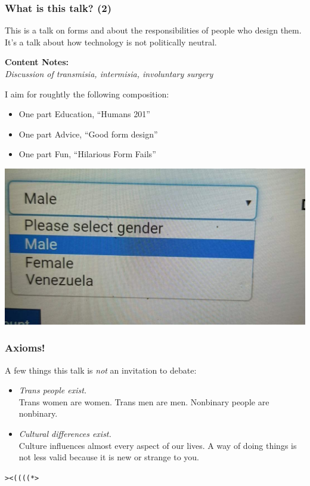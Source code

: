 \documentclass[aspectratio=169,x11names]{beamer}
\begin{document}
\begin{frame}
\frametitle{What is this talk? (2)}
\large

This is a talk on forms and about the responsibilities of people who design them. It's a talk about how technology is not politically neutral.

\pause\bigskip

\begin{center}
\textbf{Content Notes:}\\
\emph{Discussion of transmisia, intermisia, involuntary surgery}
\end{center}

\pause\bigskip

I aim for roughtly the following composition:
\medskip

\begin{itemize}
\item One part Education, ``Humans 201''
\item One part Advice, ``Good form design''
\item One part Fun, ``Hilarious Form Fails''
\end{itemize}
\end{frame}

\begin{frame}
\begin{center}
\includegraphics[scale=0.3]{images/ineffyble_01} 
\end{center}
\end{frame}


\begin{frame}
\frametitle{Axioms!}
A few things this talk is \emph{not} an invitation to debate:
\bigskip

\begin{itemize}
\item\emph{Trans people exist.}\\
Trans women are women. Trans men are men. Nonbinary people are nonbinary.
\medskip

\item\emph{Cultural differences exist.}\\
Culture influences almost every aspect of our lives. A way of doing things is not less valid because it is new or strange to you.
\end{itemize}
\bigskip

\huge
\begin{center}
\texttt{><((((*>}
\end{center}

\end{frame}
\end{document}
